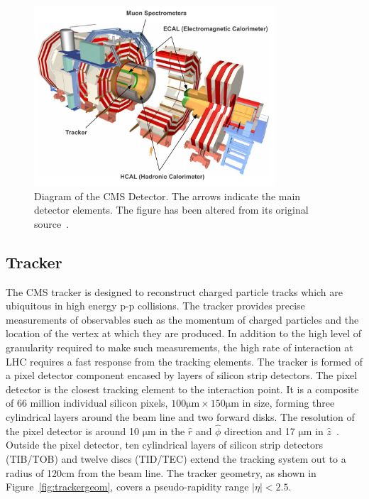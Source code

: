 \begin{figure}
\centering
	\includegraphics[width=0.8\textwidth]{detector/cmsdetector}
	\caption{Diagram of the CMS Detector. The arrows indicate the main detector elements. 
	The figure has been altered from its original source~\citep{cmspub}.}
	\label{fig:cms}
\end{figure}

\subsection{Tracker}
The CMS tracker is designed to reconstruct charged particle tracks 
which are ubiquitous in high energy 
p-p collisions. The tracker provides precise measurements of 
observables such as the momentum of charged particles and the location of the
vertex at which they are produced.
In addition to the high level of granularity required to make such measurements, the 
high rate of interaction at LHC requires a fast response from the tracking 
elements. 
The tracker is formed of a pixel detector component encased by layers of silicon strip detectors.
The pixel detector is the closest tracking element to the interaction point. 
It is a composite of 66 million individual silicon pixels, $100\mathrm{\mu m} \times 150 \mathrm{\mu m}$ in size,
forming three cylindrical layers around the beam line and two forward disks. 
The resolution of the pixel detector is around 10 $\mathrm{\mu}$m in the $\hat{r}$ and $\hat{\phi}$ 
direction and 17 $\mathrm{\mu}$m in $\hat{z}$~\citep{trckAC}. 
Outside the pixel detector, ten cylindrical layers of silicon strip detectors (TIB/TOB) 
and twelve discs (TID/TEC) extend the tracking system out to a radius of 120cm from the 
beam line. The tracker geometry, as shown in Figure~\ref{fig:trackergeom}, covers a pseudo-rapidity 
range $|\eta| < 2.5$.

